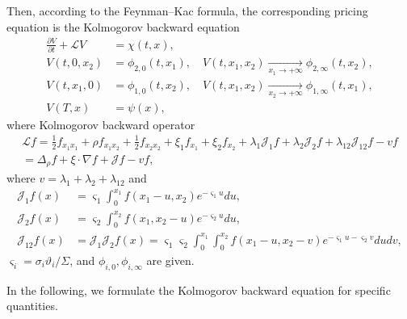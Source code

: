 Then, according to the Feynman--Kac formula, the corresponding pricing equation is the Kolmogorov backward equation
\begin{align}
		\label{kolm_1}
		\frac{\partial V}{\partial t} + \mathcal{L} V &= \chi(t, x), \\
		V(t, 0, x_2) &= \phi_{2, 0}(t, x_1), \quad V(t, x_1, x_2) \underset{x_1 \to +\infty}{\longrightarrow} \phi_{2, \infty}(t, x_2), \\
		V(t, x_1, 0) &= \phi_{1, 0}(t, x_2), \quad V(t, x_1, x_2) \underset{x_2 \to +\infty}{\longrightarrow} \phi_{1, \infty}(t, x_1), \\
		\label{kolm_2} V(T, x) &= \psi(x),
\end{align}
where Kolmogorov backward operator
\begin{multline}
	\label{kolmogorov_backward}
	\mathcal{L} f = \frac{1}{2}  f_{x_1 x_1} + \rho f_{x_1 x_2} + \frac{1}{2}  f_{x_2 x_2} +  \xi_1 f_{x_1} + \xi_2 f_{x_2} +  \lambda_{1}  \mathcal{J}_1 f + \lambda_{2}  \mathcal{J}_2 f + \lambda_{12}  \mathcal{J}_{12} f - v  f \\
	= \Delta_{\rho} f + \xi \cdot \nabla f + \mathcal{J} f - v f,
\end{multline}
where $v = \lambda_1 + \lambda_2 + \lambda_{12}$ and
\begin{align}
\mathcal{J}_1 f(x) &= \varsigma_1 \int_0^{x_1} f(x_1 - u,  x_2) e^{-\varsigma_1 u} d u, \label{j1_eq}\\
\mathcal{J}_2 f(x) &= \varsigma_2 \int_0^{x_2} f(x_1,  x_2 - u) e^{-\varsigma_2 u} d u, \label{j2_eq}\\
\mathcal{J}_{12} f(x) &=  \mathcal{J}_1 \mathcal{J}_2 f(x) =  \varsigma_1  \varsigma_2  \int_0^{x_1} \int_0^{x_2} f(x_1 - u, x_2 - v) e^{-\varsigma_1 u - \varsigma_2 v} d u d v \label{j12_eq},
\end{align}
$\varsigma_i = \sigma_i \vartheta_i / \Sigma$, and $\phi_{i, 0}, \phi_{i, \infty}$ are given.

In the following, we formulate the Kolmogorov backward equation for specific quantities.

